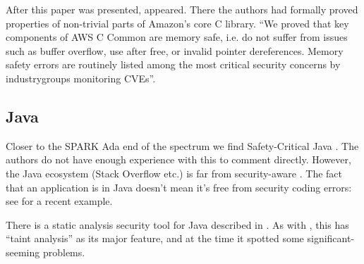 \documentclass{llncs}
\begin{document}
After this paper was presented, \cite{Chongetal2020a} appeared. There the authors had formally proved properties of non-trivial parts of Amazon's core C library. ``We proved that key components of AWS C Common are memory safe,  i.e.  do  not  suffer  from  issues  such  as  buffer  overflow,  use after free, or invalid pointer dereferences. Memory safety errors are routinely listed among the most critical security concerns by industrygroups monitoring CVEs''.
\subsection{Java}
Closer to the SPARK Ada end of the spectrum we find Safety-Critical Java \cite{Cavalcantietal2017a}.  The authors do not have enough experience with this to comment directly. However, the Java ecosystem (Stack Overflow etc.) is far from security-aware \cite{Mengetal2018a}.                                                                                                                                                                                                                                                                                                                                                   The fact that an application is in Java doesn't mean it's free from security coding errors: see \cite{Google2018a} for a recent example.
\par
There is a static analysis security tool for Java described in \cite{LivshitsLam2005}.
As with \cite{ISO2013d}, this has ``taint analysis'' as its major feature, and at the time it spotted some significant-seeming problems.
\end{document}
